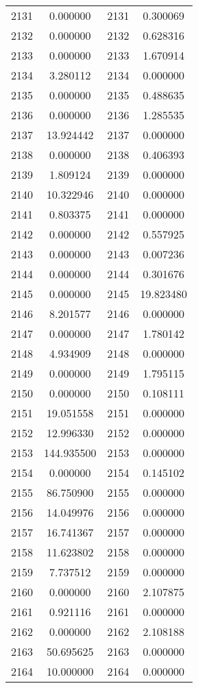 \documentclass[12pt]{article}
\begin{document}
\begin{longtable}{@{}cccc@{}}
2131 & 0.000000 & 2131 & 0.300069 \\
2132 & 0.000000 & 2132 & 0.628316 \\
2133 & 0.000000 & 2133 & 1.670914 \\
2134 & 3.280112 & 2134 & 0.000000 \\
2135 & 0.000000 & 2135 & 0.488635 \\
2136 & 0.000000 & 2136 & 1.285535 \\
2137 & 13.924442 & 2137 & 0.000000 \\
2138 & 0.000000 & 2138 & 0.406393 \\
2139 & 1.809124 & 2139 & 0.000000 \\
2140 & 10.322946 & 2140 & 0.000000 \\
2141 & 0.803375 & 2141 & 0.000000 \\
2142 & 0.000000 & 2142 & 0.557925 \\
2143 & 0.000000 & 2143 & 0.007236 \\
2144 & 0.000000 & 2144 & 0.301676 \\
2145 & 0.000000 & 2145 & 19.823480 \\
2146 & 8.201577 & 2146 & 0.000000 \\
2147 & 0.000000 & 2147 & 1.780142 \\
2148 & 4.934909 & 2148 & 0.000000 \\
2149 & 0.000000 & 2149 & 1.795115 \\
2150 & 0.000000 & 2150 & 0.108111 \\
2151 & 19.051558 & 2151 & 0.000000 \\
2152 & 12.996330 & 2152 & 0.000000 \\
2153 & 144.935500 & 2153 & 0.000000 \\
2154 & 0.000000 & 2154 & 0.145102 \\
2155 & 86.750900 & 2155 & 0.000000 \\
2156 & 14.049976 & 2156 & 0.000000 \\
2157 & 16.741367 & 2157 & 0.000000 \\
2158 & 11.623802 & 2158 & 0.000000 \\
2159 & 7.737512 & 2159 & 0.000000 \\
2160 & 0.000000 & 2160 & 2.107875 \\
2161 & 0.921116 & 2161 & 0.000000 \\
2162 & 0.000000 & 2162 & 2.108188 \\
2163 & 50.695625 & 2163 & 0.000000 \\
2164 & 10.000000 & 2164 & 0.000000 \\

\end{longtable}
\end{document}
